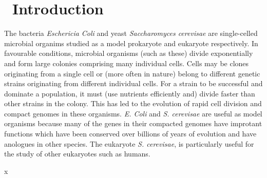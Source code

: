 \graphicspath{{images/}}

\section{\thesection~Introduction}
\label{sec:introduction}




The bacteria \textit{Eschericia Coli} and yeast \textit{Saccharomyces
  cerevisae} are single-celled microbial organims studied as a model
prokaryote and eukaryote respectively. In favourable conditions,
microbial organisms (such as these) divide exponentially and form
large colonies comprising many individual cells. Cells may be clones
originating from a single cell or (more often in nature) belong to
different genetic strains originating from different individual
cells. For a strain to be successful and dominate a population, it
must (use nutrients efficiently and) divide faster than other strains
in the colony. This has led to the evolution of rapid cell division
and compact genomes in these organisms. \textit{E. Coli} and
\textit{S.  cerevisae} are useful as model organisms because many of
the genes in their compacted genomes have improtant functions which
have been conserved over billions of years of evolution and have
anologues in other species. The eukaryote \textit{S. cerevisae}, is
particularly useful for the study of other eukaryotes such as humans.



x

